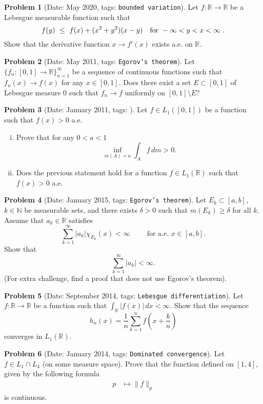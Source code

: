 \documentclass[11pt, notitlepage]{article}
\theoremstyle{definition}
\theoremstyle{definition}
\theoremstyle{definition}
\newtheorem{probstate}{Problem}
\theoremstyle{remark}
\newenvironment{problem}[2]{
    \begin{probstate}[Date: #1, tags: {\color{white} \texttt{#2}}]
}
{
  \end{probstate}
}
\newcommand{\R}{\mathbb{R}}
\begin{document}
\begin{problem}{May 2020}{bounded variation}
  Let $f:\mathbb{R}\to\mathbb{R}$ be a Lebesgue measurable function such that
$$
f(y) \ \le \ f(x)+(x^2+y^2)(x-y) \quad {\rm for \ } -\infty<y<x<\infty \ .
$$
Show that the derivative function $x\to f'(x)$ exists a.e. on $\mathbb{R}$.
\end{problem}

\begin{problem}{May 2011}{Egorov's theorem}
  Let $\{f_n: [0,1] \to \R\}_{n=1}^\infty$ be a sequence of continuous functions
     such that $f_n(x) \to f(x)$ for any $x \in [0,1]$. Does there
     exist a set $E \subset [0,1]$ of Lebesgue measure 0 such that
     $f_n \to f$ uniformly on $[0,1] \setminus E$?
\end{problem}

\begin{problem}{January 2011}{}
  Let $f \in L_1([0,1])$ be a function such that $f(x)>0$ a.e.
 \begin{enumerate}[(i)]
 \item Prove that for any $0<a<1$
 \[
   \inf_{m(A)=a} \int_A f \, dm >0.
 \]
 \item Does the previous statement hold for a function $f \in L_1(\mathbb R)$ such that $f(x)>0$ a.e.
 \end{enumerate}
\end{problem}

\begin{problem}{January 2015}{Egorov's theorem}
Let $E_k\subset [a,b]$, $k\in\mathbb N$ be measurable sets, and there exists $\delta>0$ such that $m(E_k)\ge \delta$ for all $k$.
 Assume that $a_k\in\mathbb R$ satisfies
$$\sum_{k=1}^\infty |a_k|\chi_{E_k}(x)<\infty\qquad \text{ for a.e. }  x\in [a,b].$$
Show that
$$\sum_{k=1}^\infty |a_k|<\infty.$$
(For extra challenge, find a proof that does not use Egorov's theorem).
\end{problem}

\begin{problem}{September 2014}{Lebesgue differentiation}
Let  $f: \R \to \R$ be a function such that $\int_{\R} |f(x)| \, dx < \infty$. Show that the sequence
\[
 h_n(x)=\frac{1}{n} \sum_{k=1}^n f \left(x+ \frac{k}{n} \right)
\]
converges in $L_1(\R)$.
\end{problem}

\begin{problem}{January 2014}{Dominated convergence}
Let $f\in L_1\cap L_4$ (on some measure space).  Prove that the function defined on $[1,4]$, given by the following formula
\begin{align*}
p & \mapsto \|f\|_p
\end{align*}
 is continuous.
\end{problem}
\end{document}
